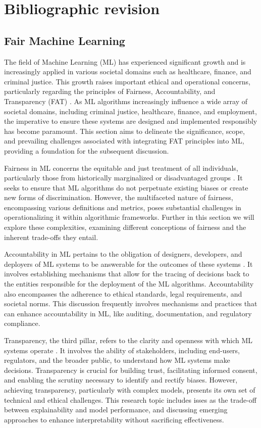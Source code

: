 
\chapter{Bibliographic revision}

\section{Fair Machine Learning}

The field of Machine Learning (ML) has experienced significant growth and is increasingly applied in various societal domains such as healthcare, finance, and criminal justice. This growth raises important ethical and operational concerns, particularly regarding the principles of Fairness, Accountability, and Transparency (FAT) \citep{Memarian2023}. As ML algorithms increasingly influence a wide array of societal domains, including criminal justice, healthcare, finance, and employment, the imperative to ensure these systems are designed and implemented responsibly has become paramount. This section aims to delineate the significance, scope, and prevailing challenges associated with integrating FAT principles into ML, providing a foundation for the subsequent discussion.

Fairness in ML concerns the equitable and just treatment of all individuals, particularly those from historically marginalized or disadvantaged groups \citep{Mehrabi2019, caton2023}. It seeks to ensure that ML algorithms do not perpetuate existing biases or create new forms of discrimination. However, the multifaceted nature of fairness, encompassing various definitions and metrics, poses substantial challenges in operationalizing it within algorithmic frameworks. Further in this section we will explore these complexities, examining different conceptions of fairness and the inherent trade-offs they entail.

Accountability in ML pertains to the obligation of designers, developers, and deployers of ML systems to be answerable for the outcomes of these systems \citep{Hutchinson2021}. It involves establishing mechanisms that allow for the tracing of decisions back to the entities responsible for the deployment of the ML algorithms. Accountability also encompasses the adherence to ethical standards, legal requirements, and societal norms. This discussion frequently involves mechanisms and practices that can enhance accountability in ML, like auditing, documentation, and regulatory compliance.

Transparency, the third pillar, refers to the clarity and openness with which ML systems operate \citep{Burkart2021}. It involves the ability of stakeholders, including end-users, regulators, and the broader public, to understand how ML systems make decisions. Transparency is crucial for building trust, facilitating informed consent, and enabling the scrutiny necessary to identify and rectify biases. However, achieving transparency, particularly with complex models, presents its own set of technical and ethical challenges. This research topic includes isses as the trade-off between explainability and model performance, and discussing emerging approaches to enhance interpretability without sacrificing effectiveness.

